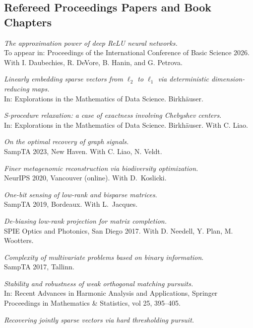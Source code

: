 \documentclass[11pt]{article}
\begin{document}
\subsection{Refereed Proceedings Papers and Book Chapters}
\betaremune
\item {\sl The approximation power of deep ReLU neural networks.}\\
To appear in: Proceedings of the International Conference of Basic Science 2026. With I. Daubechies, R. DeVore, B. Hanin, and G. Petrova.
\item {\sl Linearly embedding sparse vectors from $\ell_2$ to $\ell_1$
via deterministic dimension-reducing maps.}\\
In: Explorations in the Mathematics of Data Science. Birkh\"auser.
\item {\sl S-procedure relaxation: a case of exactness involving Chebyshev centers}.\\
In: Explorations in the Mathematics of Data Science. Birkh\"auser. With C. Liao.
\item {\sl On the optimal recovery of graph signals.}\\
SampTA 2023, New Haven.  With C. Liao, N. Veldt.
\item {\sl Finer metagenomic reconstruction via biodiversity optimization.}\\
NeurIPS 2020, Vancouver (online).
With D.~Koslicki.
\item {\sl One-bit sensing of low-rank and bisparse matrices}.\\
SampTA 2019, Bordeaux. With L.~Jacques.
\item {\sl De-biasing low-rank projection for matrix completion.}\\
SPIE Optics and Photonics, San Diego 2017.
With D. Needell, Y. Plan, M. Wootters.
\item {\sl Complexity of multivariate problems based on binary information}.\\
SampTA 2017, Tallinn.
\item {\sl Stability and robustness of weak orthogonal matching pursuits.}\\
In: Recent Advances in Harmonic Analysis and  Applications,
Springer Proceedings in Mathematics \& Statistics, vol 25, 395--405.
\item {\sl Recovering jointly sparse vectors via hard thresholding pursuit.}\\ 
\end{document}
